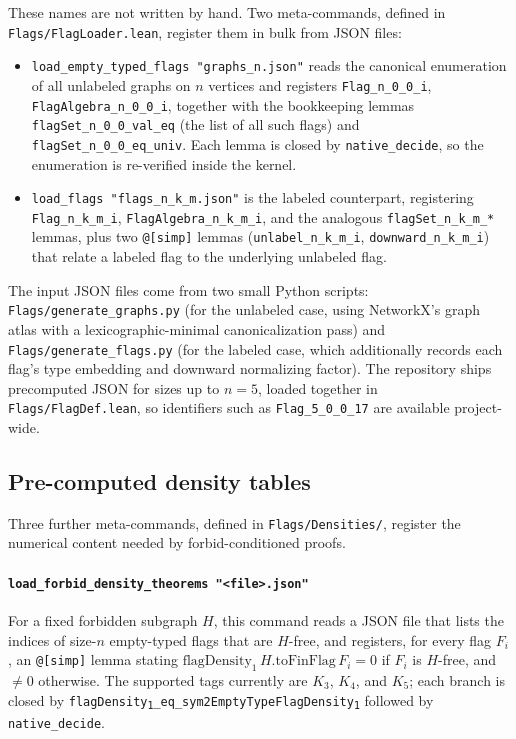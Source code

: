 \documentclass[11pt]{article}
\begin{document}
These names are not written by hand. Two meta-commands, defined in
\texttt{Flags/FlagLoader.lean}, register them in bulk from JSON files:
\begin{itemize}
  \item \texttt{load\_empty\_typed\_flags "graphs\_n.json"} reads the
    canonical enumeration of all unlabeled graphs on $n$ vertices and
    registers \texttt{Flag\_n\_0\_0\_i}, \texttt{FlagAlgebra\_n\_0\_0\_i},
    together with the bookkeeping lemmas
    \texttt{flagSet\_n\_0\_0\_val\_eq} (the list of all such flags) and
    \texttt{flagSet\_n\_0\_0\_eq\_univ}. Each lemma is closed by
    \texttt{native\_decide}, so the enumeration is re-verified inside the
    kernel.
  \item \texttt{load\_flags "flags\_n\_k\_m.json"} is the labeled
    counterpart, registering \texttt{Flag\_n\_k\_m\_i},
    \texttt{FlagAlgebra\_n\_k\_m\_i}, and the analogous
    \texttt{flagSet\_n\_k\_m\_*} lemmas, plus two \texttt{@[simp]} lemmas
    (\texttt{unlabel\_n\_k\_m\_i}, \texttt{downward\_n\_k\_m\_i}) that
    relate a labeled flag to the underlying unlabeled flag.
\end{itemize}
The input JSON files come from two small Python scripts:
\texttt{Flags/generate\_graphs.py} (for the unlabeled case, using
NetworkX's graph atlas with a lexicographic-minimal canonicalization
pass) and \texttt{Flags/generate\_flags.py} (for the labeled case, which
additionally records each flag's type embedding and downward normalizing
factor). The repository ships precomputed JSON for sizes up to
$n=5$, loaded together in \texttt{Flags/FlagDef.lean}, so identifiers
such as \texttt{Flag\_5\_0\_0\_17} are available project-wide.

\subsection{Pre-computed density tables}
\label{sec:density-tables}

Three further meta-commands, defined in \texttt{Flags/Densities/}, register
the numerical content needed by forbid-conditioned proofs.

\paragraph{\texttt{load\_forbid\_density\_theorems "<file>.json"}}
For a fixed forbidden subgraph $H$, this command reads a JSON file that
lists the indices of size-$n$ empty-typed flags that are $H$-free, and
registers, for every flag $F_i$, an \texttt{@[simp]} lemma stating
$\mathrm{flagDensity}_1\,H.\mathrm{toFinFlag}\,F_i = 0$ if $F_i$ is
$H$-free, and $\ne 0$ otherwise. The supported tags currently are $K_3$,
$K_4$, and $K_5$; each branch is closed by
\texttt{flagDensity\textsubscript{1}\_eq\_sym2EmptyTypeFlagDensity\textsubscript{1}}
followed by \texttt{native\_decide}.
\end{document}
